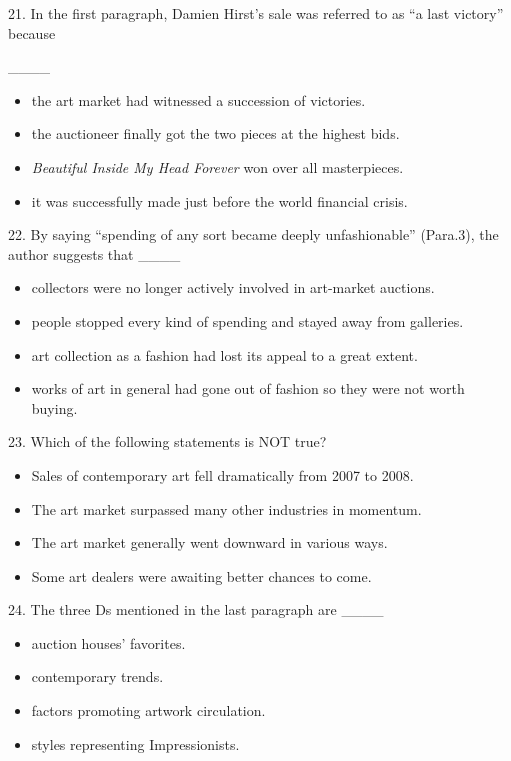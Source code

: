 \documentclass[UTF8,11pt]{ctexart}
\begin{document}
21. In the first paragraph, Damien Hirst’s sale was referred to as “a last victory” because


\_\_\_\_


\begin{itemize}[leftmargin=2em,itemsep=.2em,topsep=.4em]\item[A.] the art market had witnessed a succession of victories.
\item[B.] the auctioneer finally got the two pieces at the highest bids.
\item[C.] \textit{Beautiful Inside My Head Forever} won over all masterpieces.
\item[D.] it was successfully made just before the world financial crisis.
\end{itemize}

22. By saying “spending of any sort became deeply unfashionable” (Para.3), the author suggests that \_\_\_\_


\begin{itemize}[leftmargin=2em,itemsep=.2em,topsep=.4em]\item[A.] collectors were no longer actively involved in art-market auctions.
\item[B.] people stopped every kind of spending and stayed away from galleries.
\item[C.] art collection as a fashion had lost its appeal to a great extent.
\item[D.] works of art in general had gone out of fashion so they were not worth buying.
\end{itemize}

23. Which of the following statements is NOT true?


\begin{itemize}[leftmargin=2em,itemsep=.2em,topsep=.4em]\item[A.] Sales of contemporary art fell dramatically from 2007 to 2008.
\item[B.] The art market surpassed many other industries in momentum.
\item[C.] The art market generally went downward in various ways.
\item[D.] Some art dealers were awaiting better chances to come.
\end{itemize}

24. The three Ds mentioned in the last paragraph are \_\_\_\_


\begin{itemize}[leftmargin=2em,itemsep=.2em,topsep=.4em]\item[A.] auction houses’ favorites.
\item[B.] contemporary trends.
\item[C.] factors promoting artwork circulation.
\item[D.] styles representing Impressionists.
\end{itemize}
\end{document}
